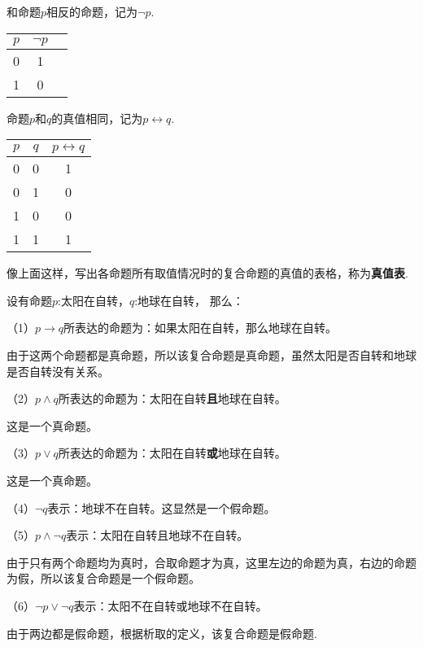 \begin{definition}[否定]
    和命题$p$相反的命题，记为$\neg p$.
\end{definition}
\begin{tabular}{c|c|c}
    $p$ & $\neg p$  \\
    \hline
    0 & 1  \\
    1 & 0 
\end{tabular}

\begin{definition}[双条件]
    命题$p$和$q$的真值相同，记为$p \leftrightarrow q$.
\end{definition}
\begin{tabular}{c|c|c}
    $p$ & $q$ & $p \leftrightarrow q$ \\
    \hline
    0 & 0 & 1 \\
    0 & 1 & 0 \\
    1 & 0 & 0 \\
    1 & 1 & 1
\end{tabular}

像上面这样，写出各命题所有取值情况时的复合命题的真值的表格，称为\textbf{真值表}.

\begin{example}
    设有命题$p$:太阳在自转，$q$:地球在自转，
    那么：

    （1）$p \to q$所表达的命题为：如果太阳在自转，那么地球在自转。\par
    由于这两个命题都是真命题，所以该复合命题是真命题，虽然太阳是否自转和地球是否自转没有关系。

    （2）$p \wedge q$所表达的命题为：太阳在自转\textbf{且}地球在自转。\par
    这是一个真命题。

    （3）$p \vee q$所表达的命题为：太阳在自转\textbf{或}地球在自转。\par
    这是一个真命题。

    （4）$\neg q$表示：地球不在自转。这显然是一个假命题。

    （5）$p \wedge \neg q$表示：太阳在自转且地球不在自转。\par
    由于只有两个命题均为真时，合取命题才为真，这里左边的命题为真，右边的命题为假，所以该复合命题是一个假命题。

    （6）$\neg p \vee \neg q$表示：太阳不在自转或地球不在自转。\par
    由于两边都是假命题，根据析取的定义，该复合命题是假命题.
\end{example}

